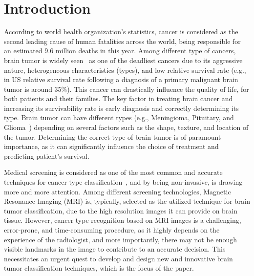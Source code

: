 \documentclass{article}
\begin{document}
\section{Introduction} \label{sec:Introduction}
According to world health organization's statistics, cancer is considered as the second leading cause of human fatalities across the world, being responsible for an estimated $9.6$ million deaths in this year. Among different type of cancers, brain tumor is widely seen~\cite{Siegel:2016} as one of the deadliest cancers due to its aggressive nature, heterogeneous characteristics (types), and low relative survival  rate (e.g., in US relative survival rate following a diagnosis of a primary malignant brain tumor is around 35\%). This cancer can drastically influence the quality of life, for both patients and their families. The key factor in treating brain cancer and increasing its survivability rate is early diagnosis and correctly determining its type. Brain tumor can have different types (e.g., Meningioma, Pituitary, and Glioma~\cite{Cheng:2015}) depending on several factors such as the shape, texture, and location of the tumor. Determining the correct type of brain tumor is of paramount importance, as it can significantly influence the choice of treatment and predicting patient's survival.

Medical screening is considered as one of the most common and accurate techniques for cancer type classification~\cite{National}, and by being non-invasive, is drawing more and more attention. Among different screening technologies, Magnetic Resonance Imaging (MRI) is, typically, selected as the utilized technique for brain tumor classification, due to the high resolution images it can provide on brain tissue. However, cancer type recognition based on MRI images is a challenging, error-prone, and time-consuming procedure, as it highly depends on the experience of the radiologist, and more importantly, there may not be enough visible landmarks in the image to contribute to an accurate decision. This necessitates an urgent quest to develop and design new and innovative brain tumor classification techniques, which is the focus of the paper.
\end{document}
